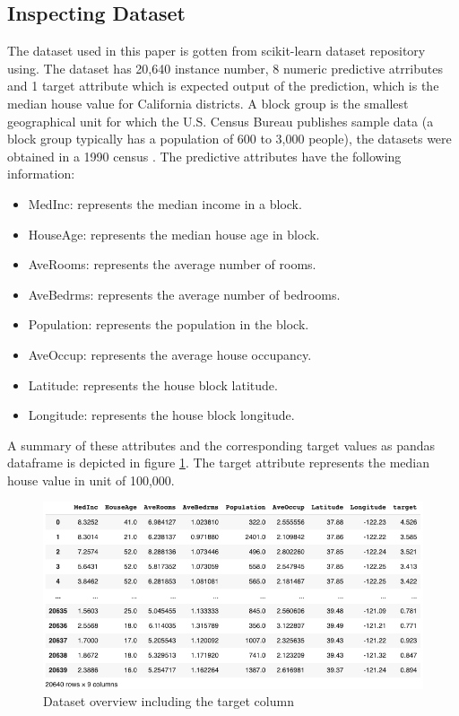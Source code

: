 \documentclass[conference]{IEEEtran}
\begin{document}
\subsection{Inspecting Dataset}
The dataset used in this paper is gotten from scikit-learn dataset repository using. 
The dataset has 20,640 instance number, 8 numeric predictive atrributes and 1 target attribute which is expected output of the prediction, which is the median house value for California districts. A block group is the smallest geographical unit for which the U.S. Census Bureau publishes sample data (a block group typically has a population of 600 to 3,000 people), the datasets were obtained in a 1990 census \cite{KELLEYPACE1997291}.
The predictive attributes have the following information: 
	\begin{itemize}
		\item MedInc: represents the median income in a block.
		\item HouseAge: represents the median house age in block.
        		\item AveRooms: represents the average number of rooms.
        		\item AveBedrms: represents the average number of bedrooms.
        		\item Population: represents the population in the block.
        		\item AveOccup: represents the average house occupancy.
	        \item Latitude: represents the house block latitude.
        		\item Longitude: represents the house block longitude.
	\end{itemize}
A summary of these attributes and the corresponding target values as pandas dataframe is depicted in figure \ref{fig:overview_dataset_with_target}. The target attribute represents the median house value in unit of 100,000.

\begin{figure}[htbp]
	\centerline{\includegraphics [scale=0.32]{figures/overview_dataset_with_target.png}}
	\caption{Dataset overview including the target column}
	\label{fig:overview_dataset_with_target}
\end{figure}
\end{document}
